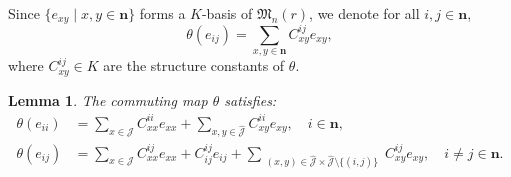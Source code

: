 \documentclass[reqno]{amsart}
\theoremstyle{plain}
\newtheorem{lemma}[theorem]{Lemma}
\theoremstyle{definition}
\begin{document}
Since $\{e_{xy} \mid x,y \in \mathbf{n} \}$ forms a $K$-basis of $\mathfrak{M}_n(r)$, we denote for all $i, j \in \mathbf{n}$,
\[
\theta(e_{ij}) = \sum_{x,y \in \mathbf{n}} C_{xy}^{ij} e_{xy},
\]
where $C_{xy}^{ij}\in K$ are the structure constants of $\theta$.

\begin{lemma}\label{l22}
The commuting map $\theta$ satisfies:
 \begin{align}
 \theta(e_{ii}) &= \sum_{x \in \mathcal{J}} C_{xx}^{ii} e_{xx} + \sum_{x,y \in \hat{\mathcal{J}}} C_{xy}^{ii} e_{xy}, \quad i   \in \mathbf{n},  \label{eq1}\\
 \theta(e_{ij}) &= \sum_{x \in \mathcal{J}} C_{xx}^{ij} e_{xx} + C_{ij}^{ij} e_{ij} + 
 \sum_{\substack{(x,y) \in \hat{\mathcal{J}}\times \hat{\mathcal{J}}\setminus \{(i,j)\}}} C_{xy}^{ij} e_{xy}, \quad i \neq j \in \mathbf{n}.\label{eq2}
 \end{align}
\end{lemma}
\end{document}
